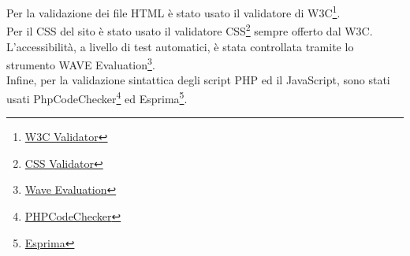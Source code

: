 Per la validazione dei file HTML è stato usato il validatore di W3C\footnote{\href{https://validator.w3.org/}{W3C Validator}}.\\
Per il CSS del sito è stato usato il validatore CSS\footnote{\href{http://www.css-validator.org/}{CSS Validator}} sempre offerto dal W3C.\\
L'accessibilità, a livello di test automatici, è stata controllata tramite lo strumento WAVE Evaluation\footnote{\href{https://wave.webaim.org/}{Wave Evaluation}}.\\
Infine, per la validazione sintattica degli script PHP ed il JavaScript, sono stati usati PhpCodeChecker\footnote{\href{https://phpcodechecker.com/}{PHPCodeChecker}} ed Esprima\footnote{\href{https://esprima.org/demo/validate.html}{Esprima}}.